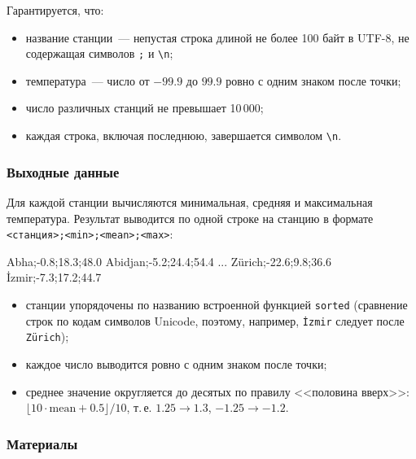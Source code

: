 \documentclass[11pt,a4paper]{article}
\newcommand{\code}[1]{\texttt{#1}}
\begin{document}
Гарантируется, что:
\begin{itemize}
  \item название станции~— непустая строка длиной не более 100 байт в UTF-8, не содержащая
        символов \code{;} и \code{\textbackslash n};
  \item температура~— число от $-99.9$ до $99.9$ ровно с одним знаком после точки;
  \item число различных станций не превышает 10\,000;
  \item каждая строка, включая последнюю, завершается символом \code{\textbackslash n}.
\end{itemize}

\subsubsection*{Выходные данные}

Для каждой станции вычисляются минимальная, средняя и максимальная температура. Результат
выводится по одной строке на станцию в формате \code{<станция>;<min>;<mean>;<max>}:
\begin{plaintext}
Abha;-0.8;18.3;48.0
Abidjan;-5.2;24.4;54.4
...
Zürich;-22.6;9.8;36.6
İzmir;-7.3;17.2;44.7
\end{plaintext}
\begin{itemize}
  \item станции упорядочены по названию встроенной функцией \code{sorted} (сравнение строк
        по кодам символов Unicode, поэтому, например, \code{İzmir} следует после \code{Zürich});
  \item каждое число выводится ровно с одним знаком после точки;
  \item среднее значение округляется до десятых по правилу <<половина вверх>>:
        $\lfloor 10\cdot\text{mean} + 0.5\rfloor / 10$, т.\,е. $1.25 \to 1.3$, $-1.25 \to -1.2$.
\end{itemize}

\subsubsection*{Материалы}
\end{document}
